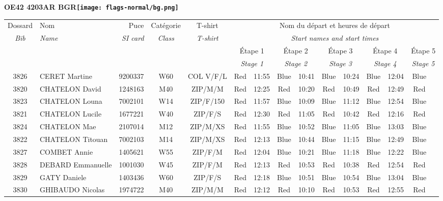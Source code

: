 \documentclass{report}
\begin{document}
\newpage
  \Huge \centering \bfseries OE42 4203AR BGR\normalfont \footnotesize \sffamily \hfill \texttt{[image: flags-normal/bg.png]} \newline 
  \begin{longtable}{|c|l|r|c|c|*{5}{cc|}}
    Dossard & Nom  & Puce    & Catégorie & T-shirt & \multicolumn{10}{c|}{Nom du départ et heures de départ} \\
    \itshape Bib     & \itshape Name & \itshape SI card & \itshape Class  & \itshape  T-shirt  & \multicolumn{10}{c|}{\itshape Start names and start times} \\
    \hline
    & & & & & \multicolumn{2}{c|}{Étape 1} & \multicolumn{2}{c|}{Étape 2} & \multicolumn{2}{c|}{Étape 3} & \multicolumn{2}{c|}{Étape 4} & \multicolumn{2}{c|}{Étape 5} \\
    & & & & & \multicolumn{2}{c|}{\itshape Stage 1} & \multicolumn{2}{c|}{\itshape Stage 2} & \multicolumn{2}{c|}{\itshape Stage 3} & \multicolumn{2}{c|}{\itshape Stage 4} & \multicolumn{2}{c|}{\itshape Stage 5} \\
    \hline
    3826 & CERET Martine & 9200337 & W60 & COL V/F/L & Red & 11:55 & Blue & 10:41 & Blue & 10:24 & Blue & 12:04 & Blue &  \\
    3820 & CHATELON David & 1248163 & M40 & ZIP/M/M & Red & 12:25 & Red & 10:20 & Red & 10:49 & Red & 12:49 & Red &  \\
    3823 & CHATELON Louna & 7002101 & W14 & ZIP/F/150 & Red & 11:57 & Blue & 10:09 & Blue & 11:12 & Blue & 12:54 & Blue &  \\
    3821 & CHATELON Lucile & 1677221 & W40 & ZIP/F/S & Red & 12:30 & Red & 11:05 & Red & 10:42 & Red & 12:16 & Red &  \\
    3824 & CHATELON Mae & 2107014 & M12 & ZIP/M/XS & Red & 11:55 & Blue & 10:52 & Blue & 11:05 & Blue & 13:03 & Blue &  \\
    3822 & CHATELON Titouan & 7002103 & M14 & ZIP/M/XS & Red & 12:13 & Blue & 10:44 & Blue & 11:15 & Blue & 12:49 & Blue &  \\
    3827 & COMBET Annie & 1405621 & W55 & ZIP/F/M & Red & 12:04 & Blue & 10:21 & Blue & 11:18 & Blue & 12:22 & Blue &  \\
    3828 & DEBARD Emmanuelle & 1001030 & W45 & ZIP/F/M & Red & 12:13 & Red & 10:53 & Red & 10:38 & Red & 12:54 & Red &  \\
    3829 & GATY Daniele & 1403436 & W60 & ZIP/F/S & Red & 12:18 & Blue & 10:51 & Blue & 10:54 & Blue & 13:04 & Blue &  \\
    3830 & GHIBAUDO Nicolas & 1974722 & M40 & ZIP/M/M & Red & 12:12 & Red & 10:10 & Red & 10:53 & Red & 12:55 & Red &  \\

\end{longtable}
\end{document}
